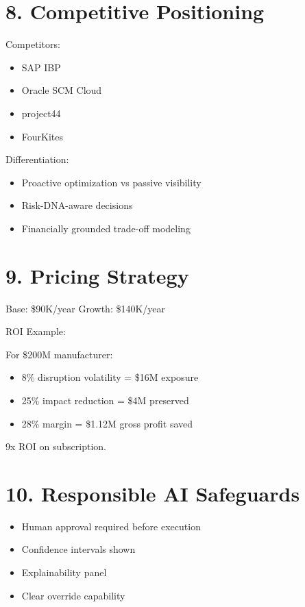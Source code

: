 \documentclass[11pt]{article}
\begin{document}
\section*{8. Competitive Positioning}

Competitors:
\begin{itemize}
    \item SAP IBP
    \item Oracle SCM Cloud
    \item project44
    \item FourKites
\end{itemize}

Differentiation:

\begin{itemize}
    \item Proactive optimization vs passive visibility
    \item Risk-DNA-aware decisions
    \item Financially grounded trade-off modeling
\end{itemize}

\section*{9. Pricing Strategy}

Base: \$90K/year  
Growth: \$140K/year  

ROI Example:

For \$200M manufacturer:

\begin{itemize}
    \item 8\% disruption volatility = \$16M exposure
    \item 25\% impact reduction = \$4M preserved
    \item 28\% margin = \$1.12M gross profit saved
\end{itemize}

9x ROI on subscription.

\section*{10. Responsible AI Safeguards}

\begin{itemize}
    \item Human approval required before execution
    \item Confidence intervals shown
    \item Explainability panel
    \item Clear override capability
\end{itemize}
\end{document}
